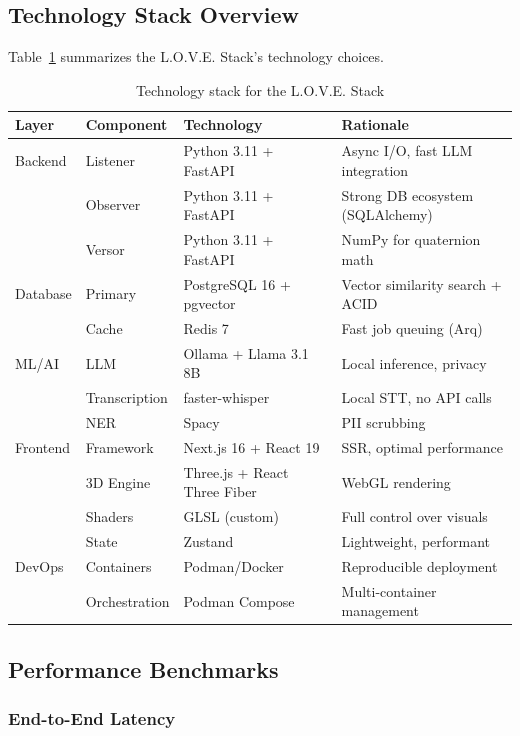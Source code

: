 \subsection{Technology Stack Overview}

Table~\ref{tab:tech-stack} summarizes the L.O.V.E. Stack's technology choices.

\begin{table}[t]
\centering
\caption{Technology stack for the L.O.V.E. Stack}
\label{tab:tech-stack}
\small
\begin{tabular}{llll}
\toprule
\textbf{Layer} & \textbf{Component} & \textbf{Technology} & \textbf{Rationale} \\
\midrule
Backend & Listener & Python 3.11 + FastAPI & Async I/O, fast LLM integration \\
& Observer & Python 3.11 + FastAPI & Strong DB ecosystem (SQLAlchemy) \\
& Versor & Python 3.11 + FastAPI & NumPy for quaternion math \\
\midrule
Database & Primary & PostgreSQL 16 + pgvector & Vector similarity search + ACID \\
& Cache & Redis 7 & Fast job queuing (Arq) \\
\midrule
ML/AI & LLM & Ollama + Llama 3.1 8B & Local inference, privacy \\
& Transcription & faster-whisper & Local STT, no API calls \\
& NER & Spacy & PII scrubbing \\
\midrule
Frontend & Framework & Next.js 16 + React 19 & SSR, optimal performance \\
& 3D Engine & Three.js + React Three Fiber & WebGL rendering \\
& Shaders & GLSL (custom) & Full control over visuals \\
& State & Zustand & Lightweight, performant \\
\midrule
DevOps & Containers & Podman/Docker & Reproducible deployment \\
& Orchestration & Podman Compose & Multi-container management \\
\bottomrule
\end{tabular}
\end{table}

\subsection{Performance Benchmarks}

\subsubsection{End-to-End Latency}

